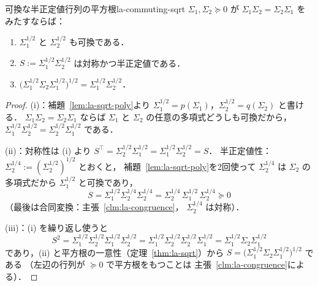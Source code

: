 \begin{corollary}{可換な半正定値行列の平方根}{la-commuting-sqrt}
  $\Sigma_1,\Sigma_2\succeq0$ が $\Sigma_1\Sigma_2=\Sigma_2\Sigma_1$ をみたすならば：
  \begin{enumerate}
    \item $\Sigma_1^{1/2}$ と $\Sigma_2^{1/2}$ も可換である．
    \item $S:=\Sigma_1^{1/2}\Sigma_2^{1/2}$ は対称かつ半正定値である．
    \item $\bigl(\Sigma_1^{1/2}\Sigma_2\Sigma_1^{1/2}\bigr)^{1/2}
      =\Sigma_1^{1/2}\Sigma_2^{1/2}$．
  \end{enumerate}
\end{corollary}

\begin{proof}
  (i)：補題~\ref{lem:la-sqrt-poly}より
  $\Sigma_1^{1/2}=p(\Sigma_1)$，$\Sigma_2^{1/2}=q(\Sigma_2)$ と書ける．
  $\Sigma_1\Sigma_2=\Sigma_2\Sigma_1$ ならば
  $\Sigma_1$ と $\Sigma_2$ の任意の多項式どうしも可換だから，
  $\Sigma_1^{1/2}\Sigma_2^{1/2}=\Sigma_2^{1/2}\Sigma_1^{1/2}$ である．

  (ii)：対称性は (i) より
  $S^\top=\Sigma_2^{1/2}\Sigma_1^{1/2}=\Sigma_1^{1/2}\Sigma_2^{1/2}=S$．
  半正定値性：$\Sigma_2^{1/4}:=(\Sigma_2^{1/2})^{1/2}$ とおくと，
  補題~\ref{lem:la-sqrt-poly}を2回使って $\Sigma_2^{1/4}$ は
  $\Sigma_2$ の多項式だから $\Sigma_1^{1/2}$ と可換であり，
  \[
    S=\Sigma_1^{1/2}\Sigma_2^{1/4}\Sigma_2^{1/4}
    =\Sigma_2^{1/4}\,\Sigma_1^{1/2}\,\Sigma_2^{1/4}
    \succeq0
  \]
  （最後は合同変換：主張~\ref{clm:la-congruence}，
  $\Sigma_2^{1/4}$ は対称）．

  (iii)：(i) を繰り返し使うと
  \[
    S^2
    =\Sigma_1^{1/2}\Sigma_2^{1/2}\Sigma_1^{1/2}\Sigma_2^{1/2}
    =\Sigma_1^{1/2}\Sigma_2^{1/2}\Sigma_2^{1/2}\Sigma_1^{1/2}
    =\Sigma_1^{1/2}\Sigma_2\Sigma_1^{1/2}
  \]
  であり，(ii) と平方根の一意性（定理~\ref{thm:la-sqrt}）から
  $S=\bigl(\Sigma_1^{1/2}\Sigma_2\Sigma_1^{1/2}\bigr)^{1/2}$ である
  （左辺の行列が $\succeq0$ で平方根をもつことは
  主張~\ref{clm:la-congruence}による）．
\end{proof}

